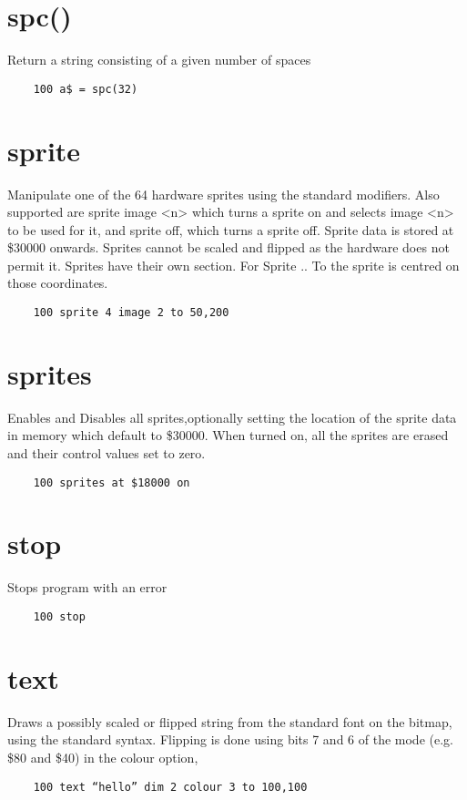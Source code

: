 \section*{spc()}
Return a string consisting of a given number of spaces
\example{}
\begin{verbatim}
	100 a$ = spc(32)
\end{verbatim}

\section*{sprite}
Manipulate one of the 64 hardware sprites using the standard modifiers. Also supported are sprite image <n> which turns a sprite on and selects image <n> to be used for it, and sprite off, which turns a sprite off. Sprite data is stored at \$30000 onwards. Sprites cannot be scaled and flipped as the hardware does not permit it. Sprites have their own section. For Sprite .. To the sprite is centred on those coordinates.
\example{}
\begin{verbatim}
	100 sprite 4 image 2 to 50,200
\end{verbatim}

\section*{sprites}
Enables and Disables all sprites,optionally setting the location of the sprite data in memory which default to \$30000. When turned on, all the sprites are erased and their control values set to zero.
\example{}
\begin{verbatim}
	100 sprites at $18000 on
\end{verbatim}

\section*{stop}
Stops program with an error
\example{}
\begin{verbatim}
	100 stop
\end{verbatim}

\section*{text}
Draws a possibly scaled or flipped string from the standard font on the bitmap, using the standard syntax. Flipping is done using bits 7 and 6 of the mode (e.g. \$80 and \$40) in the colour option, 
\example{}
\begin{verbatim}
	100 text “hello” dim 2 colour 3 to 100,100
\end{verbatim}

